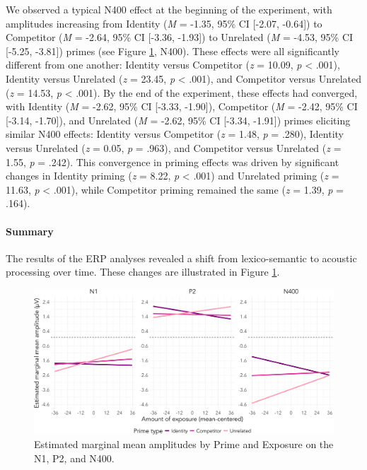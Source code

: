 \documentclass[
  12pt,
  twoside]{article}
\begin{document}
We observed a typical N400 effect at the beginning of the experiment, with amplitudes increasing from Identity (\emph{M} = -1.35, 95\% CI {[}-2.07, -0.64{]}) to Competitor (\emph{M} = -2.64, 95\% CI {[}-3.36, -1.93{]}) to Unrelated (\emph{M} = -4.53, 95\% CI {[}-5.25, -3.81{]}) primes (see Figure \ref{fig:erp-eff-fig}, N400).
These effects were all significantly different from one another: Identity versus Competitor (\emph{z} = 10.09, \emph{p} \textless{} .001), Identity versus Unrelated (\emph{z} = 23.45, \emph{p} \textless{} .001), and Competitor versus Unrelated (\emph{z} = 14.53, \emph{p} \textless{} .001).
By the end of the experiment, these effects had converged, with Identity (\emph{M} = -2.62, 95\% CI {[}-3.33, -1.90{]}), Competitor (\emph{M} = -2.42, 95\% CI {[}-3.14, -1.70{]}), and Unrelated (\emph{M} = -2.62, 95\% CI {[}-3.34, -1.91{]}) primes eliciting similar N400 effects: Identity versus Competitor (\emph{z} = 1.48, \emph{p} = .280), Identity versus Unrelated (\emph{z} = 0.05, \emph{p} = .963), and Competitor versus Unrelated (\emph{z} = 1.55, \emph{p} = .242).
This convergence in priming effects was driven by significant changes in Identity priming (\emph{z} = 8.22, \emph{p} \textless{} .001) and Unrelated priming (\emph{z} = 11.63, \emph{p} \textless{} .001), while Competitor priming remained the same (\emph{z} = 1.39, \emph{p} = .164).

\hypertarget{summary-1}{%
\paragraph{Summary}\label{summary-1}}

The results of the ERP analyses revealed a shift from lexico-semantic to acoustic processing over time.
These changes are illustrated in Figure \ref{fig:erp-eff-fig}.

\begin{figure}[H]

{\centering \includegraphics[width=\textwidth]{sections/code/outputs/erp_eff} 

}

\caption{Estimated marginal mean amplitudes by Prime and Exposure on the N1, P2, and N400.}\label{fig:erp-eff-fig}
\end{figure}
\end{document}

